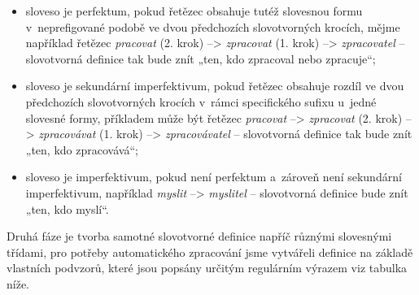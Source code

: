 \begin{itemize}
\tightlist
\item
  sloveso je perfektum, pokud řetězec obsahuje tutéž slovesnou formu
v~neprefigované podobě ve dvou předchozích slovotvorných krocích, mějme
  například řetězec \emph{pracovat} (2. krok) --\textgreater{}
  \emph{zpracovat} (1. krok) --\textgreater{} \emph{zpracovatel} --
  slovotvorná definice tak bude znít „ten, kdo zpracoval nebo
  zpracuje``;
\item
  sloveso je sekundární imperfektivum, pokud řetězec obsahuje rozdíl ve
  dvou předchozích slovotvorných krocích v~rámci specifického sufixu
u~jedné slovesné formy, příkladem může být řetězec \emph{pracovat}
  --\textgreater{} \emph{zpracovat} (2. krok) --\textgreater{}
  \emph{zpracovávat} (1. krok) --\textgreater{} \emph{zpracovávatel} --
  slovotvorná definice tak bude znít „ten, kdo zpracovává``;
\item
  sloveso je imperfektivum, pokud není perfektum a~zároveň není
  sekundární imperfektivum, například \emph{myslit} --\textgreater{}
  \emph{myslitel} -- slovotvorná definice bude znít „ten, kdo myslí``.
\end{itemize}

Druhá fáze je tvorba samotné slovotvorné definice napříč různými
slovesnými třídami, pro potřeby automatického zpracování jsme vytvářeli
definice na základě vlastních podvzorů, které jsou popsány určitým
regulárním výrazem viz tabulka níže.
